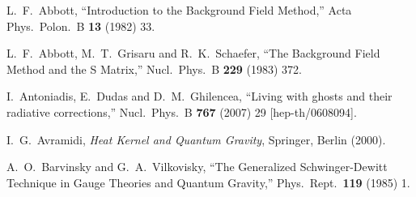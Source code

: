 



\begin{thebibliography}{99}



		\fancyhead{} %
			\fancyhead[LE]{\scshape \leftmark}
			\fancyhead[RO]{\scshape \rightmark}
	\fancyfoot[CE,CO]{\thepage}
	\fancyfoot[LO,RO]{ }
	\fancyfoot[LE,RE]{ }
		 		\renewcommand{\headrulewidth}{0.4pt}
			\renewcommand{\footrulewidth}{0.4pt}
		\pagestyle{fancy}


	
	
	
  

  L.~F.~Abbott,
  ``Introduction to the Background Field Method,''
  Acta Phys.\ Polon.\ B {\bf 13} (1982) 33.




  L.~F.~Abbott, M.~T.~Grisaru and R.~K.~Schaefer,
  ``The Background Field Method and the S Matrix,''
  Nucl.\ Phys.\ B {\bf 229} (1983) 372.





  I.~Antoniadis, E.~Dudas and D.~M.~Ghilencea,
  ``Living with ghosts and their radiative corrections,''
  Nucl.\ Phys.\ B {\bf 767} (2007) 29
  [hep-th/0608094].
  
  


  
   I.~G.~Avramidi, {\em Heat Kernel and Quantum Gravity}, Springer, Berlin
(2000).







  A.~O.~Barvinsky and G.~A.~Vilkovisky,
  ``The Generalized Schwinger-Dewitt Technique in Gauge Theories and Quantum Gravity,''
  Phys.\ Rept.\  {\bf 119} (1985) 1.


\end{thebibliography}

